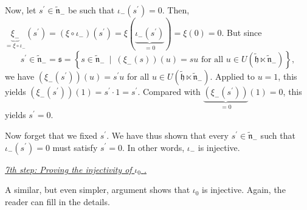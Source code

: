 \documentclass[etingof-lie.tex]{subfiles}
\begin{document}
Now, let $s^{\prime}\in\widetilde{\mathfrak{n}}_{-}$ be such that $\iota
_{-}\left(  s^{\prime}\right)  =0$. Then, $\underbrace{\xi_{-}}_{=\xi
\circ\iota_{-}}\left(  s^{\prime}\right)  =\left(  \xi\circ\iota_{-}\right)
\left(  s^{\prime}\right)  =\xi\left(  \underbrace{\iota_{-}\left(  s^{\prime
}\right)  }_{=0}\right)  =\xi\left(  0\right)  =0$. But since%
\[
s^{\prime}\in\widetilde{\mathfrak{n}}_{-}=\mathfrak{s}=\left\{  s\in
\widetilde{\mathfrak{n}}_{-}\ \mid\ \left(  \xi_{-}\left(  s\right)  \right)
\left(  u\right)  =su\text{ for all }u\in U\left(  \widetilde{\mathfrak{h}%
}\ltimes\widetilde{\mathfrak{n}}_{-}\right)  \right\}  ,
\]
we have $\left(  \xi_{-}\left(  s^{\prime}\right)  \right)  \left(  u\right)
=s^{\prime}u$ for all $u\in U\left(  \widetilde{\mathfrak{h}}\ltimes
\widetilde{\mathfrak{n}}_{-}\right)  $. Applied to $u=1$, this yields $\left(
\xi_{-}\left(  s^{\prime}\right)  \right)  \left(  1\right)  =s^{\prime}%
\cdot1=s^{\prime}$. Compared with $\underbrace{\left(  \xi_{-}\left(
s^{\prime}\right)  \right)  }_{=0}\left(  1\right)  =0$, this yields
$s^{\prime}=0$.

Now forget that we fixed $s^{\prime}$. We have thus shown that every
$s^{\prime}\in\widetilde{\mathfrak{n}}_{-}$ such that $\iota_{-}\left(
s^{\prime}\right)  =0$ must satisfy $s^{\prime}=0$. In other words, $\iota
_{-}$ is injective.

\bigskip

\underline{\textit{7th step: Proving the injectivity of }$\iota_{0}$%
\textit{.}}

\begin{vershort}
A similar, but even simpler, argument shows that $\iota_{0}$ is injective.
Again, the reader can fill in the details.
\end{vershort}
\end{document}
